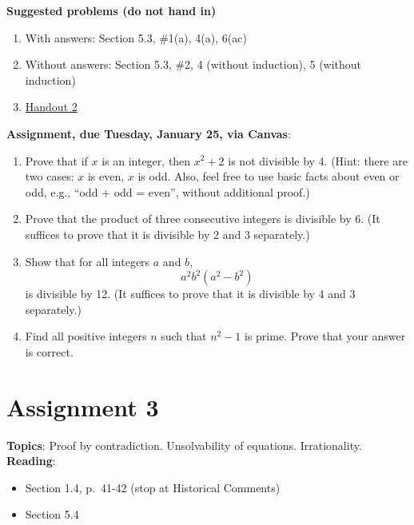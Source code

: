 \documentclass[12pt]{article}
\begin{document}
\noindent \textbf{Suggested problems (do not hand in)}

\begin{enumerate}
\item With answers: Section 5.3, \#1(a), 4(a), 6(ac)

\item Without answers: Section 5.3, \#2, 4 (without induction), 5 (without induction)

\item \href{https://www.math.emory.edu/~dzb/teaching/250Fall2021/handouts/250-H02-divisibility.pdf}{Handout 2}
\end{enumerate}


\noindent \textbf{Assignment, due Tuesday, January 25, via Canvas}:

\begin{enumerate}
\item Prove that if $x$ is an integer, then $x^2 + 2$ is not divisible by 4. (Hint: there are two cases: $x$ is even, $x$ is odd. Also, feel free to use basic facts about even or odd, e.g., ``odd + odd = even'', without additional proof.)
\item Prove that the product of three consecutive integers is divisible by 6. (It suffices to prove that it is divisible by 2 and 3 separately.)
\item Show that for all integers $a$ and $b$, 
\[
a^2b^2(a^2 - b^2)
\]
is divisible by 12. (It suffices to prove that it is divisible by 4 and 3 separately.)
\item Find all positive integers $n$ such that $n^2 - 1$ is prime. Prove that your answer is correct.

\end{enumerate}


\newpage
\section[3 (due February 8): Proof by contradiction. Unsolvability. Irrationality.]{Assignment 3}

\textbf{Topics}: Proof by contradiction. Unsolvability of equations. Irrationality.
\\

\noindent \textbf{Reading}:
\begin{itemize}
\item Section 1.4, p.~41-42 (stop at Historical Comments)
\item Section 5.4
\end{itemize}
\end{document}
